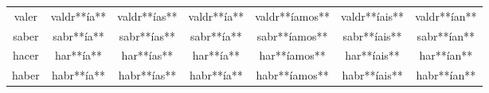 \begin{tabular}{ccccccc}
valer           & valdr**ía**    & valdr**ías**    & valdr**ía**         & valdr**íamos**     & valdr**íais**      & valdr**ían**              \\
saber           & sabr**ía**     & sabr**ías**     & sabr**ía**          & sabr**íamos**      & sabr**íais**       & sabr**ían**               \\
hacer           & har**ía**      & har**ías**      & har**ía**           & har**íamos**       & har**íais**        & har**ían**                \\
haber           & habr**ía**     & habr**ías**     & habr**ía**          & habr**íamos**      & habr**íais**       & habr**ían**               \\
\hline
\end{tabular}